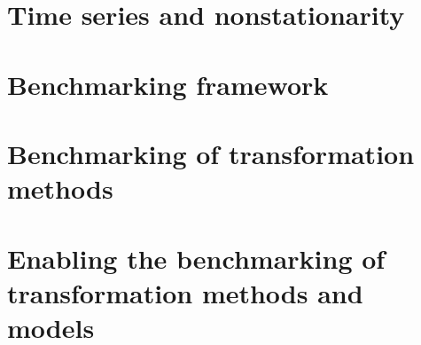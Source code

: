 \documentclass[english]{nortese} %
\begin{document}


\chapter{Time series and nonstationarity} 
\label{TSandNonstat}



\chapter{Benchmarking framework}
\label{framework}



\chapter{Benchmarking of transformation methods}
\label{experiment}



\chapter{Enabling the benchmarking of transformation methods and models}
\label{experiment2}


\end{document}
